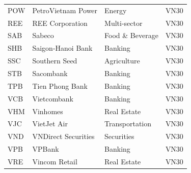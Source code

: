 \documentclass[runningheads]{llncs}
\begin{document}
\begin{table}[htbp]
\begin{tabular}{llll}
POW & PetroVietnam Power & Energy & VN30 \\
REE & REE Corporation & Multi-sector & VN30 \\
SAB & Sabeco & Food \& Beverage & VN30 \\
SHB & Saigon-Hanoi Bank & Banking & VN30 \\
SSC & Southern Seed & Agriculture & VN30 \\
STB & Sacombank & Banking & VN30 \\
TPB & Tien Phong Bank & Banking & VN30 \\
VCB & Vietcombank & Banking & VN30 \\
VHM & Vinhomes & Real Estate & VN30 \\
VJC & VietJet Air & Transportation & VN30 \\
VND & VNDirect Securities & Securities & VN30 \\
VPB & VPBank & Banking & VN30 \\
VRE & Vincom Retail & Real Estate & VN30 \\
\bottomrule
\end{tabular}
\end{table}
\end{document}
